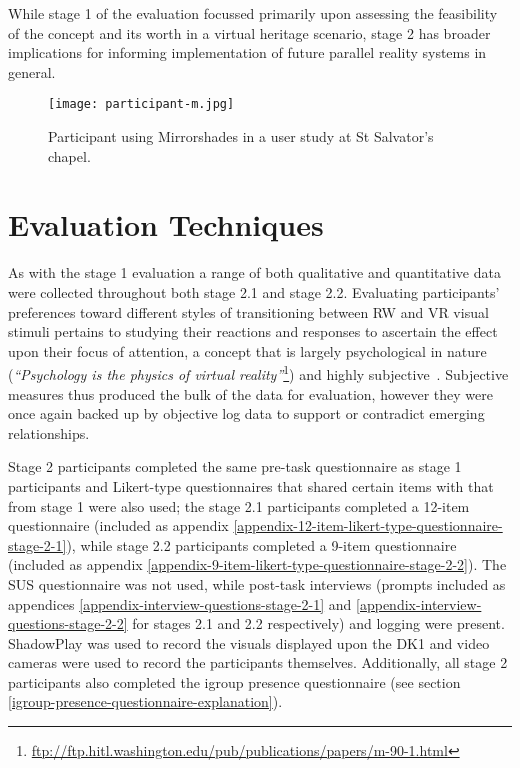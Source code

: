 While stage 1 of the evaluation focussed primarily upon assessing the feasibility of the concept and its worth in a virtual heritage scenario, stage 2 has broader implications for informing implementation of future parallel reality systems in general.

\begin{figure}[ht]
	\begin{center}
		\texttt{[image: participant-m.jpg]}
		\caption{Participant using Mirrorshades in a user study at St Salvator's chapel.}
		\label{participant-m.jpg}
	\end{center}
\end{figure}


\section{Evaluation Techniques}

As with the stage 1 evaluation a range of both qualitative and quantitative data were collected throughout both stage 2.1 and stage 2.2. Evaluating participants' preferences toward different styles of transitioning between RW and VR visual stimuli pertains to studying their reactions and responses to ascertain the effect upon their focus of attention, a concept that is largely psychological in nature (\textit{``Psychology is the physics of virtual reality''}\footnote{\url{ftp://ftp.hitl.washington.edu/pub/publications/papers/m-90-1.html}}) and highly subjective~\cite{Ijsselsteijn2001}. Subjective measures thus produced the bulk of the data for evaluation, however they were once again backed up by objective log data to support or contradict emerging relationships.

Stage 2 participants completed the same pre-task questionnaire as stage 1 participants and Likert-type questionnaires that shared certain items with that from stage 1 were also used; the stage 2.1 participants completed a 12-item questionnaire (included as appendix \ref{appendix-12-item-likert-type-questionnaire-stage-2-1}), while stage 2.2 participants completed a 9-item questionnaire (included as appendix \ref{appendix-9-item-likert-type-questionnaire-stage-2-2}). The SUS questionnaire was not used, while post-task interviews (prompts included as appendices \ref{appendix-interview-questions-stage-2-1} and \ref{appendix-interview-questions-stage-2-2} for stages 2.1 and 2.2 respectively) and logging were present. ShadowPlay was used to record the visuals displayed upon the DK1 and video cameras were used to record the participants themselves. Additionally, all stage 2 participants also completed the igroup presence questionnaire (see section \ref{igroup-presence-questionnaire-explanation}).

